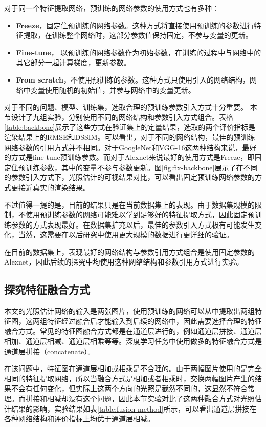 
对于同一个特征提取网络，预训练的网络参数的使用方式也有多种：
\begin{itemize}
    \item \textbf{Freeze}，固定住预训练的网络参数。这种方式将直接使用预训练的参数进行特征提取，在训练整个网络时，这部分参数值保持固定，不参与变量的更新。
    \item \textbf{Fine-tune}， 以预训练的网络参数作为初始参数，在训练的过程中与网络中的其它部分一起计算梯度，更新参数。
    \item \textbf{From scratch}，不使用预训练的参数。这种方式只使用引入的网络结构，网络中变量使用随机的初始值，并参与网络中的变量更新。
\end{itemize}

对于不同的问题、模型、训练集，选取合理的预训练参数引入方式十分重要。
本节设计了九组实验，分别使用不同的网络结构和参数引入方式组合。表格\ref{table:backbone}展示了这些方式在验证集上的定量结果，选取的两个评价指标是渲染结果上的RMSE和DSSIM。可以看出，对于不同的网络结构，最佳的预训练网络参数的引用方式并不相同。对于GoogleNet和VGG-16这两种结构来说，最好的方式是fine-tune预训练参数。而对于Alexnet来说最好的使用方式是Freeze，即固定住预训练参数，其中的变量不参与参数更新。图\ref{fig:fix-backbone}展示了在不同的参数引入方式下，光照估计的可视结果对比，可以看出固定预训练网络参数的方式更接近真实的渲染结果。


不过值得一提的是，目前的结果只是在当前数据集上的表现。由于数据集规模的限制，不使用预训练参数的网络可能难以学到足够好的特征提取方式，因此固定预训练参数的方式表现最好。在数据集扩充以后，最佳的参数引入方式极有可能发生变化，当然，这需要在以后研究中使用更大规模的数据进行更详细的验证。

在目前的数据集上，表现最好的网络结构与参数引用方式组合是使用固定参数的Alexnet，因此后续的探究中均使用这种网络结构和参数引用方式进行实验。
\subsection{探究特征融合方式}

本文的光照估计网络的输入是两张图片，使用预训练的网络可以从中提取出两组特征图，这两组特征经过融合后才能输入到后续的网络中，因此需要选择合理的特征融合方式。常见的特征图融合方式都是在通道层进行的，例如通道层拼接、通道层相加、通道层相减、通道层相乘等等。深度学习任务中使用做多的特征融合方式是通道层拼接（concatenate）。

在该问题中，特征图在通道层相加或相乘是不合理的。由于两幅图片使用的是完全相同的特征提取网络，所以当融合方式是相加或者相乘时，交换两幅图片产生的结果不会有任何变化，但实际上这两个方向的光照是截然不同的，这显然不符合常理。而拼接和相减却没有这个问题，因此本节实验对比了这两种融合方式对光照估计结果的影响，实验结果如表\ref{table:fusion-method}所示，可以看出通道层拼接在各种网络结构和评价指标上均优于通道层相减。


